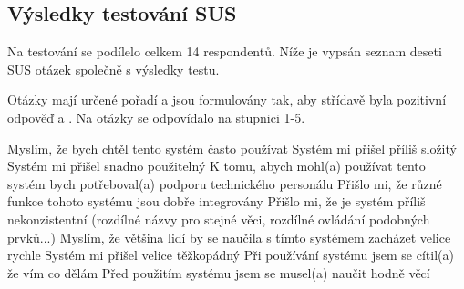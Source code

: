\subsection{Výsledky testování SUS}

Na testování se podílelo celkem 14 respondentů. Níže je vypsán seznam deseti SUS otázek společně s výsledky testu.

Otázky mají určené pořadí a jsou formulovány tak, aby střídavě byla pozitivní odpověď  a . Na otázky se odpovídalo na stupnici 1-5.

\dataone

\expandafter\def\csname question1\endcsname{Myslím, že bych chtěl tento systém často používat}
\expandafter\def\csname question2\endcsname{Systém mi přišel příliš složitý}
\expandafter\def\csname question3\endcsname{Systém mi přišel snadno použitelný}
\expandafter\def\csname question4\endcsname{K tomu, abych mohl(a) používat tento systém bych potřeboval(a) podporu technického personálu}
\expandafter\def\csname question5\endcsname{Přišlo mi, že různé funkce tohoto systému jsou dobře integrovány}
\expandafter\def\csname question6\endcsname{Přišlo mi, že je systém příliš nekonzistentní (rozdílné názvy pro stejné věci, rozdílné ovládání podobných prvků...)}
\expandafter\def\csname question7\endcsname{Myslím, že většina lidí by se naučila s tímto systémem zacházet velice rychle}
\expandafter\def\csname question8\endcsname{Systém mi přišel velice těžkopádný}
\expandafter\def\csname question9\endcsname{Při používání systému jsem se cítil(a) že vím co dělám}
\expandafter\def\csname question10\endcsname{Před použitím systému jsem se musel(a) naučit hodně věcí}
\newcommand\question[1]{\csname question#1\endcsname}

\bigskip

